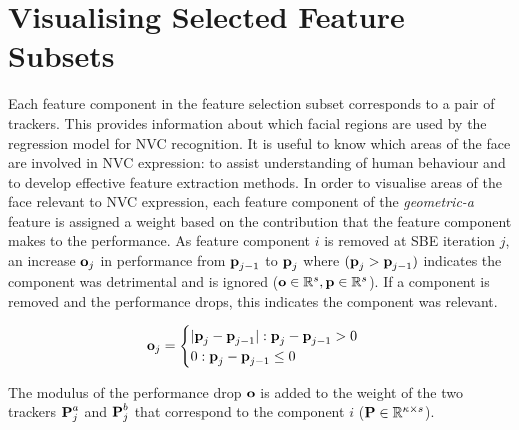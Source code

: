 \section{Visualising Selected Feature Subsets}
\label{SectionVisualiseFeatureSelection}

Each feature component in the feature selection subset corresponds to a pair of trackers. This provides information about which facial regions are used by the regression model for \ac{NVC} recognition. It is useful to know which areas of the face are involved in \ac{NVC} expression: to assist understanding of human behaviour and to develop effective feature extraction methods. 
In order to visualise areas of the face relevant to \ac{NVC} expression, each feature component of the \textit{geometric-a} feature is assigned a weight based on the contribution that the feature component makes to the performance. As feature component $i$ is removed at \ac{SBE} iteration $j$, an increase $\textbf{o}_j$ in performance from $\textbf{p}_{j-1}$ to $\textbf{p}_{j}$ where $(\textbf{p}_{j} > \textbf{p}_{j-1})$ indicates the component was detrimental and is ignored ($\textbf{o} \in \mathbb{R}^{s}, \textbf{p} \in \mathbb{R}^{s}$). If a component is removed and the performance drops, this indicates the component was relevant. 

\begin{gather}
\label{EquationWeightTracker}
\textbf{o}_{j} = \begin{cases}
|\textbf{p}_{j} - \textbf{p}_{j-1}| : \textbf{p}_{j} - \textbf{p}_{j-1} > 0 \\
0 : \textbf{p}_{j} - \textbf{p}_{j-1} \le 0
\end{cases}
\end{gather}

The modulus of the performance drop $\textbf{o}$ is added to the weight of the two trackers $\textbf{P}^a_{j}$ and $\textbf{P}^b_{j}$ that correspond to the component $i$ ($\textbf{P} \in \mathbb{R}^{\kappa \times s}$). 


